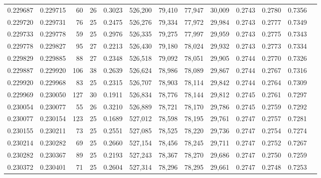 \begin{tabular}{rrrrrrrrrrrrr}
0.229687 & 0.229715 &  60 &  26 &                                     0.3023 & 526,200 &  79,410 &  77,947 &  30,009 & 0.2743 & 0.2780 & 0.7356 \\
0.229720 & 0.229731 &  76 &  25 &                                     0.2475 & 526,276 &  79,334 &  77,972 &  29,984 & 0.2743 & 0.2777 & 0.7349 \\
0.229733 & 0.229778 &  59 &  25 &                                     0.2976 & 526,335 &  79,275 &  77,997 &  29,959 & 0.2743 & 0.2775 & 0.7343 \\
0.229778 & 0.229827 &  95 &  27 &                                     0.2213 & 526,430 &  79,180 &  78,024 &  29,932 & 0.2743 & 0.2773 & 0.7334 \\
0.229829 & 0.229885 &  88 &  27 &                                     0.2348 & 526,518 &  79,092 &  78,051 &  29,905 & 0.2744 & 0.2770 & 0.7326 \\
0.229887 & 0.229920 & 106 &  38 &                                     0.2639 & 526,624 &  78,986 &  78,089 &  29,867 & 0.2744 & 0.2767 & 0.7316 \\
0.229920 & 0.229968 &  83 &  25 &                                     0.2315 & 526,707 &  78,903 &  78,114 &  29,842 & 0.2744 & 0.2764 & 0.7309 \\
0.229969 & 0.230050 & 127 &  30 &                                     0.1911 & 526,834 &  78,776 &  78,144 &  29,812 & 0.2745 & 0.2761 & 0.7297 \\
0.230054 & 0.230077 &  55 &  26 &                                     0.3210 & 526,889 &  78,721 &  78,170 &  29,786 & 0.2745 & 0.2759 & 0.7292 \\
0.230077 & 0.230154 & 123 &  25 &                                     0.1689 & 527,012 &  78,598 &  78,195 &  29,761 & 0.2747 & 0.2757 & 0.7281 \\
0.230155 & 0.230211 &  73 &  25 &                                     0.2551 & 527,085 &  78,525 &  78,220 &  29,736 & 0.2747 & 0.2754 & 0.7274 \\
0.230214 & 0.230282 &  69 &  25 &                                     0.2660 & 527,154 &  78,456 &  78,245 &  29,711 & 0.2747 & 0.2752 & 0.7267 \\
0.230282 & 0.230367 &  89 &  25 &                                     0.2193 & 527,243 &  78,367 &  78,270 &  29,686 & 0.2747 & 0.2750 & 0.7259 \\
0.230372 & 0.230401 &  71 &  25 &                                     0.2604 & 527,314 &  78,296 &  78,295 &  29,661 & 0.2747 & 0.2748 & 0.7253 \\

\end{tabular}
